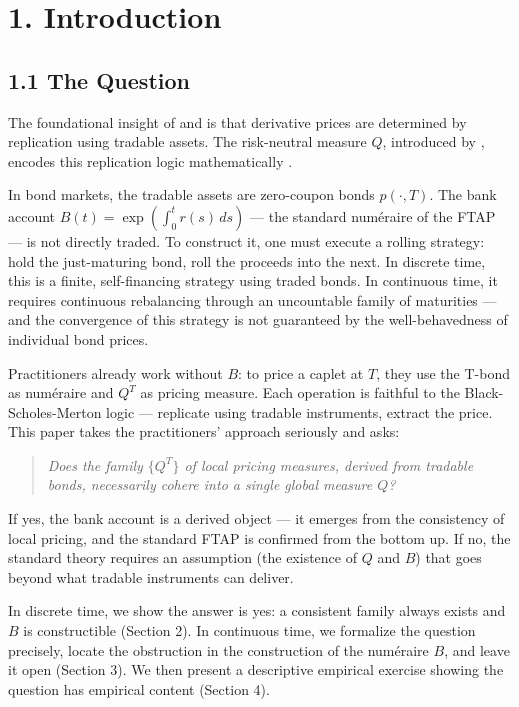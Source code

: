 \documentclass[
]{article}
\begin{document}
\section{1. Introduction}\label{introduction}

\subsection{1.1 The Question}\label{the-question}

The foundational insight of \citet{BlackScholes1973} and \citet{Merton1973}
is that derivative prices are determined by replication using tradable
assets. The risk-neutral measure \(Q\), introduced by \citet{HarrisonKreps1979}, encodes this replication logic mathematically \citep{BinghamKiesel2004}.

In bond markets, the tradable assets are zero-coupon bonds
\(p(\cdot,T)\). The bank account
\(B(t) = \exp\left( \int_{0}^{t} r(s) \, ds \right)\) --- the standard
numéraire of the FTAP --- is not directly traded. To construct it, one
must execute a rolling strategy: hold the just-maturing bond, roll the
proceeds into the next. In discrete time, this is a finite,
self-financing strategy using traded bonds. In continuous time, it
requires continuous rebalancing through an uncountable family of
maturities --- and the convergence of this strategy is not guaranteed by
the well-behavedness of individual bond prices.

Practitioners already work without \(B\): to price a caplet at \(T\),
they use the T-bond as numéraire and \(Q^T\) as pricing measure. Each
operation is faithful to the Black-Scholes-Merton logic --- replicate
using tradable instruments, extract the price. This paper takes the
practitioners' approach seriously and asks:

\begin{quote}
\emph{Does the family \(\{Q^T\}\) of local pricing measures, derived
from tradable bonds, necessarily cohere into a single global measure
\(Q\)?}
\end{quote}

If yes, the bank account is a derived object --- it emerges from the
consistency of local pricing, and the standard FTAP is confirmed from
the bottom up. If no, the standard theory requires an assumption (the
existence of \(Q\) and \(B\)) that goes beyond what tradable instruments
can deliver.

In discrete time, we show the answer is yes: a consistent family always
exists and \(B\) is constructible (Section 2). In continuous time, we
formalize the question precisely, locate the obstruction in the
construction of the numéraire \(B\), and leave it open (Section 3). We
then present a descriptive empirical exercise showing the question has
empirical content (Section 4).
\end{document}
